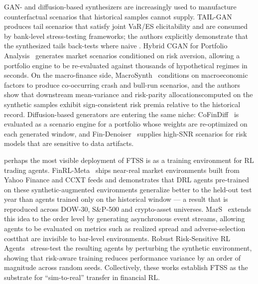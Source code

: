 GAN- and diffusion-based synthesizers are increasingly used to
manufacture counterfactual scenarios that historical
samples cannot supply. TAIL-GAN~\citep{cont2025tailgan} produces tail
scenarios that satisfy joint VaR/ES elicitability and are consumed by
bank-level stress-testing frameworks; the authors explicitly demonstrate
that the synthesized tails back-tests where naive
. Hybrid CGAN for Portfolio
Analysis~\citep{lu2022hybrid} generates market scenarios conditioned on
risk aversion, allowing a portfolio engine to be re-evaluated against
thousands of hypothetical regimes in seconds. On the macro-finance
side, MacroSynth~\citep{alex2024macroeconomic} conditions on
macroeconomic factors to produce co-occurring crash and bull-run
scenarios, and the authors show that downstream mean-\revadddec{-}variance and
risk-parity allocationscomputed on the synthetic samples exhibit
sign-consistent risk premia relative to the historical record.
Diffusion-based generators are entering the same niche:
CoFinDiff~\citep{tanaka2025cofindiff} is evaluated as a scenario engine
for a portfolio whose weights are re-optimized on each generated
window, and Fin-Denoiser~\citep{wang2024denoiser} supplies high-SNR
scenarios for risk models that are sensitive to data
artifacts.

perhaps the most visible deployment of FTSS is as a training environment for RL
trading agents. FinRL-Meta~\citep{liu2022finrlmeta} ships near-real
market environments built from Yahoo Finance and CCXT feeds and
demonstrates that DRL agents pre-trained on these synthetic-augmented
environments generalize better to the held-out test year than agents
trained only on the historical window --- a result that is reproduced
across DOW-30, S\&P-500 and crypto-asset universes.
MarS~\citep{li2025mars} extends this idea to the order level by
generating asynchronous event streams, allowing agents to be evaluated
on metrics such as realized spread and adverse-selection costthat are invisible to bar-level environments. Robust Risk-Sensitive RL
Agents~\citep{gao2021robust} stress-test the resulting agents by
perturbing the synthetic environment, showing that risk-aware training
reduces performance variance by an order of magnitude across random
seeds. Collectively, these works establish FTSS as the substrate for
``sim-to-real'' transfer in financial RL.

